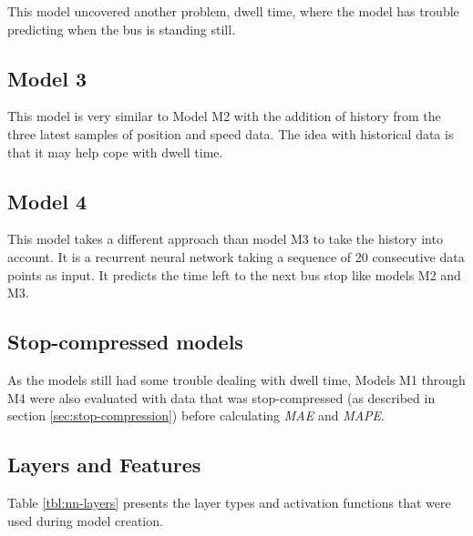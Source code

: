 This model uncovered another problem, dwell time, where the model has trouble predicting when the bus is standing still. 

\subsection{Model 3}\label{M3}
This model is very similar to Model M2 with the addition of history from the three latest samples of position and speed data. The idea with historical data is that it may help cope with dwell time.

\subsection{Model 4}
This model takes a different approach than model M3 to take the history into account. It is a recurrent neural network taking a sequence of 20 consecutive data points as input. It predicts the time left to the next bus stop like models M2 and M3. 

\subsection{Stop-compressed models}
As the models still had some trouble dealing with dwell time, Models M1 through M4 were also evaluated with data that was stop-compressed (as described in section \ref{sec:stop-compression}) before calculating \textit{MAE} and \textit{MAPE}. 

\subsection{Layers and Features}
Table \ref{tbl:nn-layers} presents the layer types and activation functions that were used during model creation.

